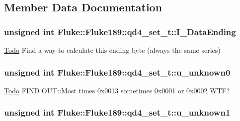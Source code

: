 \subsection{Member Data Documentation}
\hypertarget{structFluke_1_1Fluke189_1_1qd4__set__t_a08bcc1ec254053f32250beb7ae3e7219}{
\subsubsection[{I\_\-DataEnding}]{\setlength{\rightskip}{0pt plus 5cm}unsigned int {\bf Fluke::Fluke189::qd4\_\-set\_\-t::I\_\-DataEnding}}}
\label{structFluke_1_1Fluke189_1_1qd4__set__t_a08bcc1ec254053f32250beb7ae3e7219}
\begin{Desc}
\item[\hyperlink{todo__todo000020}{Todo}]Find a way to calculate this ending byte (always the same series) \end{Desc}
\hypertarget{structFluke_1_1Fluke189_1_1qd4__set__t_a35c68a594812dba53791a2e32dbfacb6}{
\subsubsection[{u\_\-unknown0}]{\setlength{\rightskip}{0pt plus 5cm}unsigned int {\bf Fluke::Fluke189::qd4\_\-set\_\-t::u\_\-unknown0}}}
\label{structFluke_1_1Fluke189_1_1qd4__set__t_a35c68a594812dba53791a2e32dbfacb6}
\begin{Desc}
\item[\hyperlink{todo__todo000017}{Todo}]FIND OUT::Most times 0x0013 sometimes 0x0001 or 0x0002 WTF? \end{Desc}
\hypertarget{structFluke_1_1Fluke189_1_1qd4__set__t_aa49bec7dfd9d22c392297cdff277afd9}{
\subsubsection[{u\_\-unknown1}]{\setlength{\rightskip}{0pt plus 5cm}unsigned int {\bf Fluke::Fluke189::qd4\_\-set\_\-t::u\_\-unknown1}}}
